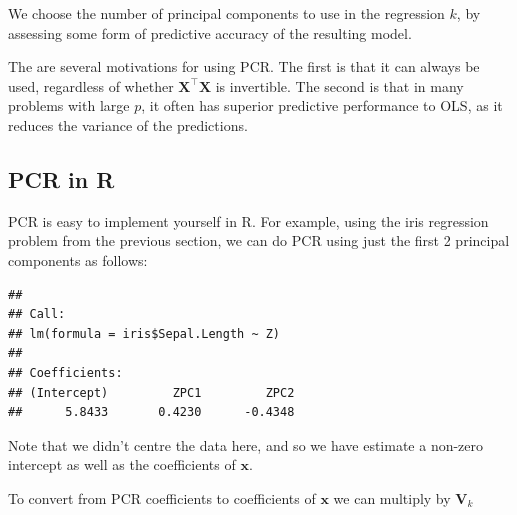 \documentclass[
]{book}
\newenvironment{Shaded}{\begin{snugshade}}{\end{snugshade}}
\newcommand{\AttributeTok}[1]{\textcolor[rgb]{0.13,0.29,0.53}{#1}}
\newcommand{\CommentTok}[1]{\textcolor[rgb]{0.56,0.35,0.01}{\textit{#1}}}
\newcommand{\ConstantTok}[1]{\textcolor[rgb]{0.56,0.35,0.01}{#1}}
\newcommand{\DecValTok}[1]{\textcolor[rgb]{0.00,0.00,0.81}{#1}}
\newcommand{\FunctionTok}[1]{\textcolor[rgb]{0.13,0.29,0.53}{\textbf{#1}}}
\newcommand{\NormalTok}[1]{#1}
\newcommand{\OtherTok}[1]{\textcolor[rgb]{0.56,0.35,0.01}{#1}}
\newcommand{\SpecialCharTok}[1]{\textcolor[rgb]{0.81,0.36,0.00}{\textbf{#1}}}
\theoremstyle{definition}
\theoremstyle{definition}
\theoremstyle{definition}
\theoremstyle{definition}
\theoremstyle{remark}
\begin{document}
We choose the number of principal components to use in the regression \(k\), by assessing some form of predictive accuracy of the resulting model.

The are several motivations for using PCR. The first is that it can always be used, regardless of whether \(\mathbf X^\top\mathbf X\) is invertible. The second is that in many problems with large \(p\), it often has superior predictive performance to OLS, as it reduces the variance of the predictions.

\subsection{PCR in R}\label{pcr-in-r}

PCR is easy to implement yourself in R. For example, using the iris regression problem from the previous section, we can do PCR using just the first 2 principal components as follows:

\begin{Shaded}
\end{Shaded}

\begin{verbatim}
## 
## Call:
## lm(formula = iris$Sepal.Length ~ Z)
## 
## Coefficients:
## (Intercept)         ZPC1         ZPC2  
##      5.8433       0.4230      -0.4348
\end{verbatim}

Note that we didn't centre the data here, and so we have estimate a non-zero intercept as well as the coefficients of \(\mathbf x\).

To convert from PCR coefficients to coefficients of \(\mathbf x\) we can multiply by \(\mathbf V_k\)

\begin{Shaded}
\end{Shaded}
\end{document}
